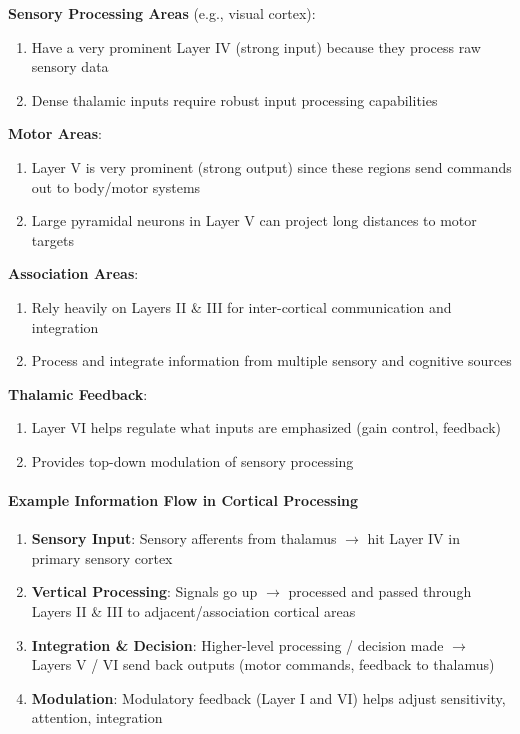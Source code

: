 \textbf{Sensory Processing Areas} (e.g., visual cortex):

\begin{enumerate}
\item Have a very prominent Layer IV (strong input) because they process raw sensory data
\item Dense thalamic inputs require robust input processing capabilities
\end{enumerate}

\textbf{Motor Areas}:

\begin{enumerate}
\item Layer V is very prominent (strong output) since these regions send commands out to body/motor systems
\item Large pyramidal neurons in Layer V can project long distances to motor targets
\end{enumerate}

\textbf{Association Areas}:

\begin{enumerate}
\item Rely heavily on Layers II \& III for inter-cortical communication and integration
\item Process and integrate information from multiple sensory and cognitive sources
\end{enumerate}

\textbf{Thalamic Feedback}:

\begin{enumerate}
\item Layer VI helps regulate what inputs are emphasized (gain control, feedback)
\item Provides top-down modulation of sensory processing
\end{enumerate}

\paragraph{Example Information Flow in Cortical Processing}
\label{para:information-flow-cortical}

\begin{enumerate}
\item \textbf{Sensory Input}: Sensory afferents from thalamus $\rightarrow$ hit Layer IV in primary sensory cortex
\item \textbf{Vertical Processing}: Signals go up $\rightarrow$ processed and passed through Layers II \& III to adjacent/association cortical areas
\item \textbf{Integration \& Decision}: Higher-level processing / decision made $\rightarrow$ Layers V / VI send back outputs (motor commands, feedback to thalamus)
\item \textbf{Modulation}: Modulatory feedback (Layer I and VI) helps adjust sensitivity, attention, integration
\end{enumerate}

